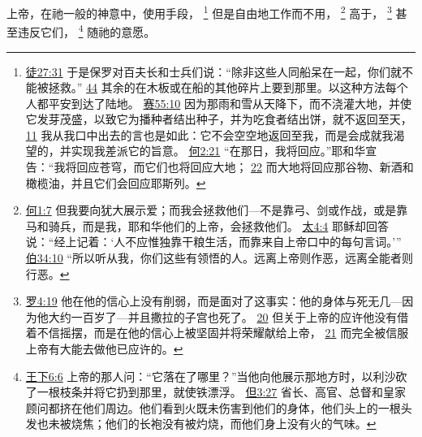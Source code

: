 \documentclass[12pt, a4paper, oneside]{ctexart}
\newcounter{parnum}[section]
\newcommand{\N}{%
   \noindent\refstepcounter{parnum}%
    \makebox[\parindent][l]{\textbf{\arabic{parnum}.}}}
\begin{document}
\N 上帝，在祂一般的神意中，使用手段，
	\footnote {
		\href{https://biblehub.com/acts/27-31.htm}{徒27:31} 于是保罗对百夫长和士兵们说：“除非这些人同船呆在一起，你们就不能被拯救。”
		\href{https://biblehub.com/acts/27-44.htm}{44} 其余的在木板或在船的其他碎片上要到那里。以这种方法每个人都平安到达了陆地。
		\href{https://biblehub.com/isaiah/55-10.htm}{赛55:10} 因为那雨和雪从天降下，而不浇灌大地，并使它发芽茂盛，以致它为播种者结出种子，并为吃食者结出饼，就不返回至天，
		\href{https://biblehub.com/isaiah/55-11.htm}{11} 我从我口中出去的言也是如此：它不会空空地返回至我，而是会成就我渴望的，并实现我差派它的旨意。
		\href{https://biblehub.com/hosea/2-21.htm}{何2:21} “在那日，我将回应。”耶和华宣告：“我将回应苍穹，而它们也将回应大地；
		\href{https://biblehub.com/hosea/2-22.htm}{22} 而大地将回应那谷物、新酒和橄榄油，并且它们会回应耶斯列。
	}
	但是自由地工作而不用，
	\footnote {
		\href{https://biblehub.com/hosea/1-7.htm}{何1:7} 但我要向犹大展示爱；而我会拯救他们---不是靠弓、剑或作战，或是靠马和骑兵，而是我，耶和华他们的上帝，会拯救他们。
		\href{https://biblehub.com/matthew/4-4.htm}{太4:4} 耶稣却回答说：“经上记着：‘人不应惟独靠干粮生活，而靠来自上帝口中的每句言词。’” 
		\href{https://biblehub.com/job/34-10.htm}{伯34:10} “所以听从我，你们这些有领悟的人。远离上帝则作恶，远离全能者则行恶。	
	}
	高于，
	\footnote {
		\href{https://biblehub.com/romans/4-19.htm}{罗4:19} 他在他的信心上没有削弱，而是面对了这事实：他的身体与死无几---因为他大约一百岁了---并且撒拉的子宫也死了。
		\href{https://biblehub.com/romans/4-20.htm}{20} 但关于上帝的应许他没有借着不信摇摆，而是在他的信心上被坚固并将荣耀献给上帝，
		\href{https://biblehub.com/romans/4-21.htm}{21} 而完全被信服上帝有大能去做他已应许的。
	}
	甚至违反它们，
	\footnote {
		\href{https://biblehub.com/2_kings/6-6.htm}{王下6:6} 上帝的那人问：“它落在了哪里？”当他向他展示那地方时，以利沙砍了一根枝条并将它扔到那里，就使铁漂浮。
		\href{https://biblehub.com/daniel/3-27.htm}{但3:27} 省长、高官、总督和皇家顾问都挤在他们周边。他们看到火既未伤害到他们的身体，他们头上的一根头发也未被烧焦；他们的长袍没有被灼烧，而他们身上没有火的气味。
	}
	随祂的意愿。
\end{document}

